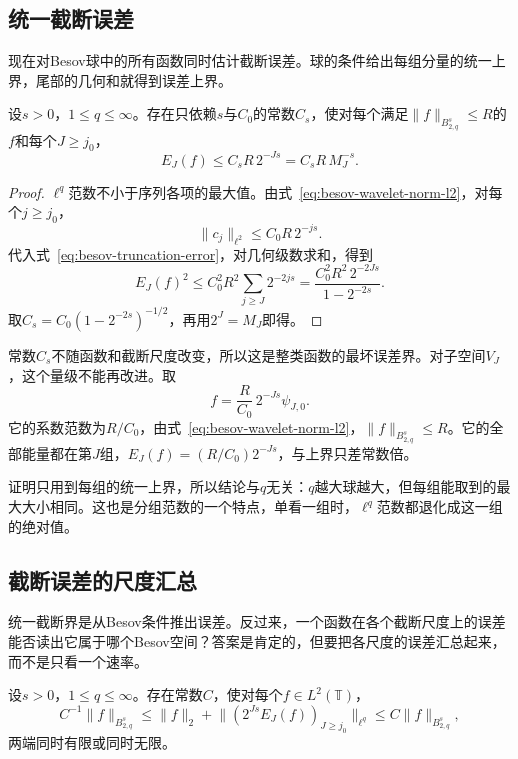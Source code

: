 \subsection{统一截断误差}
\label{sec:besov-uniform-truncation}

现在对Besov球中的所有函数同时估计截断误差。球的条件给出每组分量的统一上界，尾部的几何和就得到误差上界。

\begin{theorem}[Besov球上的统一截断界]
\label{thm:besov-uniform-truncation}
设$s>0$，$1\leq q\leq\infty$。存在只依赖$s$与$C_0$的常数$C_s$，使对每个满足$\lVert f\rVert_{B^s_{2,q}}\leq R$的$f$和每个$J\geq j_0$，
\begin{equation}
 E_J(f)\leq C_sR\,2^{-Js}=C_sR\,M_J^{-s} .
 \label{eq:besov-uniform-truncation}
\end{equation}
\end{theorem}

\begin{proof}
$\ell^q$范数不小于序列各项的最大值。由式~\eqref{eq:besov-wavelet-norm-l2}，对每个$j\geq j_0$，
\[
 \lVert c_j\rVert_{\ell^2}\leq C_0R\,2^{-js}.
\]
代入式~\eqref{eq:besov-truncation-error}，对几何级数求和，得到
\[
 E_J(f)^2\leq C_0^2R^2\sum_{j\geq J}2^{-2js}=\frac{C_0^2R^2\,2^{-2Js}}{1-2^{-2s}} .
\]
取$C_s=C_0(1-2^{-2s})^{-1/2}$，再用$2^J=M_J$即得。
\end{proof}

常数$C_s$不随函数和截断尺度改变，所以这是整类函数的最坏误差界。对子空间$V_J$，这个量级不能再改进。取
\[
 f=\frac{R}{C_0}\,2^{-Js}\psi_{J,0}.
\]
它的系数范数为$R/C_0$，由式~\eqref{eq:besov-wavelet-norm-l2}，$\lVert f\rVert_{B^s_{2,q}}\leq R$。它的全部能量都在第$J$组，$E_J(f)=(R/C_0)2^{-Js}$，与上界只差常数倍。

证明只用到每组的统一上界，所以结论与$q$无关：$q$越大球越大，但每组能取到的最大大小相同。这也是分组范数的一个特点，单看一组时，$\ell^q$范数都退化成这一组的绝对值。

\subsection{截断误差的尺度汇总}
\label{sec:besov-truncation-aggregation}

统一截断界是从Besov条件推出误差。反过来，一个函数在各个截断尺度上的误差能否读出它属于哪个Besov空间？答案是肯定的，但要把各尺度的误差汇总起来，而不是只看一个速率。

\begin{theorem}[截断误差刻画Besov条件]
\label{thm:besov-truncation-characterization}
设$s>0$，$1\leq q\leq\infty$。存在常数$C$，使对每个$f\in L^2(\mathbb T)$，
\begin{equation}
 C^{-1}\lVert f\rVert_{B^s_{2,q}}\leq\lVert f\rVert_2+\bigl\lVert(2^{Js}E_J(f))_{J\geq j_0}\bigr\rVert_{\ell^q}\leq C\lVert f\rVert_{B^s_{2,q}} ,
 \label{eq:besov-truncation-characterization}
\end{equation}
两端同时有限或同时无限。
\end{theorem}

